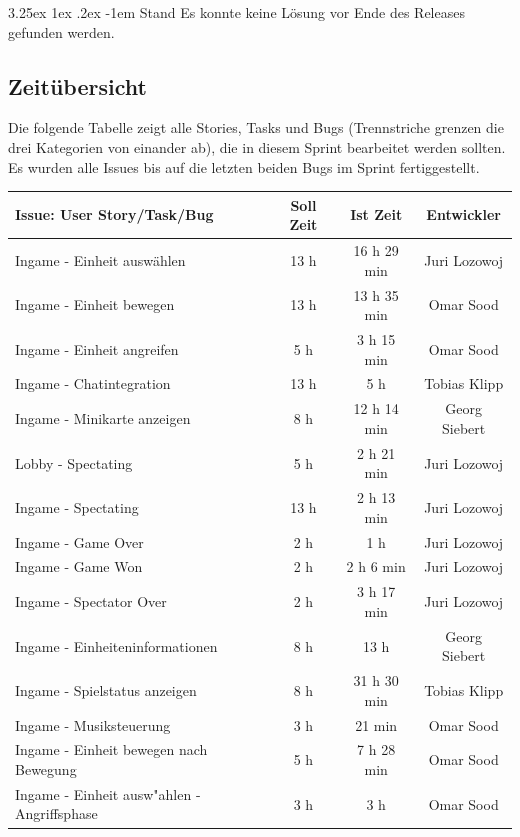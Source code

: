 \documentclass[12pt, titlepage]{scrartcl}
\makeatletter
\newcommand{\RN}[1]{%
	\textup{\uppercase\expandafter{\romannumeral#1}}%
}
\renewcommand\paragraph{\@startsection{paragraph}{5}{\z@}%
  {3.25ex \@plus1ex \@minus.2ex}%
  {-1em}%
  {\normalfont\normalsize\bfseries}}
\makeatother
\begin{document}
				\paragraph{Stand}
					Es konnte keine L\"osung vor Ende des Releases gefunden werden.
   	\newpage
    	\subsection{Zeit\"ubersicht}
    		Die folgende Tabelle zeigt alle Stories, Tasks und Bugs (Trennstriche grenzen die drei Kategorien von einander ab), die in diesem Sprint bearbeitet werden sollten. Es wurden alle Issues bis auf die letzten beiden Bugs im Sprint \RN{6} fertiggestellt.
    		\begin{longtable}[H]{p{9cm} c c c }
    			\label{Time_2}
    			\textbf{Issue: User Story/Task/Bug} & \textbf{Soll Zeit} & \textbf{Ist Zeit} & \textbf{Entwickler} \\
    			\toprule
    			\endhead
    			Ingame - Einheit ausw\"ahlen & 13 h & 16 h 29 min & Juri Lozowoj \\
    			Ingame - Einheit bewegen & 13 h & 13 h 35 min & Omar Sood \\
    			Ingame - Einheit angreifen & 5 h & 3 h 15 min & Omar Sood \\
    			Ingame - Chatintegration & 13 h & 5 h & Tobias Klipp \\
    			Ingame - Minikarte anzeigen & 8 h & 12 h 14 min & Georg Siebert \\
    			Lobby - Spectating & 5 h & 2 h 21 min & Juri Lozowoj \\
    			Ingame - Spectating & 13 h & 2 h 13 min &  Juri Lozowoj \\
    			Ingame - Game Over & 2 h & 1 h  & Juri Lozowoj \\
    			Ingame - Game Won & 2 h & 2 h 6 min & Juri Lozowoj \\
    			Ingame - Spectator Over & 2 h & 3 h 17 min & Juri Lozowoj \\
    			Ingame - Einheiteninformationen & 8 h & 13 h & Georg Siebert \\
    			Ingame - Spielstatus anzeigen & 8 h & 31 h 30 min &  Tobias Klipp \\
    			Ingame - Musiksteuerung & 3 h & 21 min &  Omar Sood \\
    			Ingame - Einheit bewegen nach Bewegung & 5 h & 7 h 28 min & Omar Sood \\
    			Ingame - Einheit ausw"ahlen - Angriffsphase & 3 h & 3 h & Omar Sood \\

\end{longtable}
\end{document}
